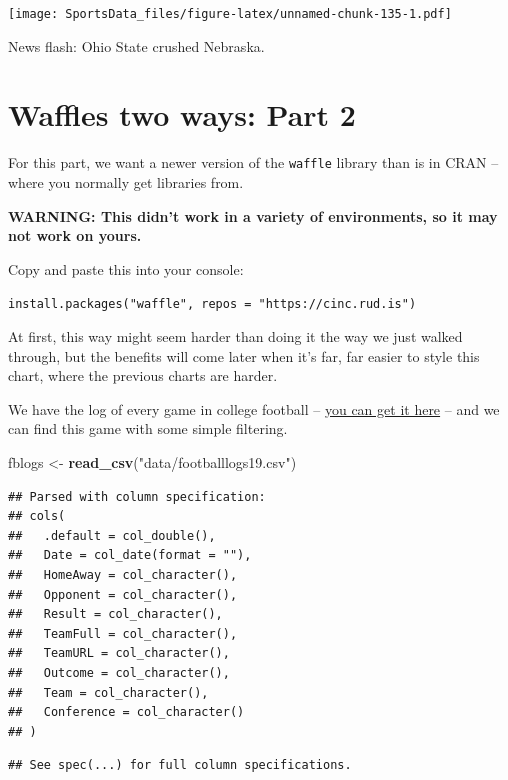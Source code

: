 \documentclass[
]{book}
\newenvironment{Shaded}{\begin{snugshade}}{\end{snugshade}}
\newcommand{\KeywordTok}[1]{\textcolor[rgb]{0.13,0.29,0.53}{\textbf{#1}}}
\newcommand{\NormalTok}[1]{#1}
\newcommand{\OperatorTok}[1]{\textcolor[rgb]{0.81,0.36,0.00}{\textbf{#1}}}
\newcommand{\StringTok}[1]{\textcolor[rgb]{0.31,0.60,0.02}{#1}}
\begin{document}
\texttt{[image: SportsData\_files/figure-latex/unnamed-chunk-135-1.pdf]}

News flash: Ohio State crushed Nebraska.

\hypertarget{waffles-two-ways-part-2}{%
\section{Waffles two ways: Part 2}\label{waffles-two-ways-part-2}}

For this part, we want a newer version of the \texttt{waffle} library than is in CRAN -- where you normally get libraries from.

\textbf{WARNING: This didn't work in a variety of environments, so it may not work on yours.}

Copy and paste this into your console:

\texttt{install.packages("waffle",\ repos\ =\ "https://cinc.rud.is")}

At first, this way might seem harder than doing it the way we just walked through, but the benefits will come later when it's far, far easier to style this chart, where the previous charts are harder.

We have the log of every game in college football -- \href{https://unl.box.com/s/2prgq48ctoxlukn6kmfjw0u1opda5s0m}{you can get it here} -- and we can find this game with some simple filtering.

\begin{Shaded}
\begin{Highlighting}[]
\NormalTok{fblogs <-}\StringTok{ }\KeywordTok{read_csv}\NormalTok{(}\StringTok{"data/footballlogs19.csv"}\NormalTok{)}
\end{Highlighting}
\end{Shaded}

\begin{verbatim}
## Parsed with column specification:
## cols(
##   .default = col_double(),
##   Date = col_date(format = ""),
##   HomeAway = col_character(),
##   Opponent = col_character(),
##   Result = col_character(),
##   TeamFull = col_character(),
##   TeamURL = col_character(),
##   Outcome = col_character(),
##   Team = col_character(),
##   Conference = col_character()
## )
\end{verbatim}

\begin{verbatim}
## See spec(...) for full column specifications.
\end{verbatim}

\begin{Shaded}
\end{Shaded}
\end{document}
